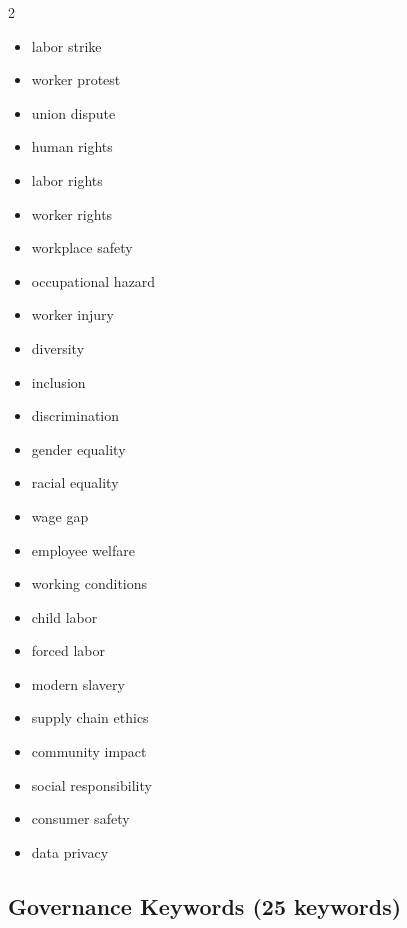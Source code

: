 \documentclass[12pt,a4paper]{article}
\begin{document}
\begin{multicols}{2}
\begin{itemize}[itemsep=0.2em]
    \item labor strike
    \item worker protest
    \item union dispute
    \item human rights
    \item labor rights
    \item worker rights
    \item workplace safety
    \item occupational hazard
    \item worker injury
    \item diversity
    \item inclusion
    \item discrimination
    \item gender equality
    \item racial equality
    \item wage gap
    \item employee welfare
    \item working conditions
    \item child labor
    \item forced labor
    \item modern slavery
    \item supply chain ethics
    \item community impact
    \item social responsibility
    \item consumer safety
    \item data privacy
\end{itemize}
\end{multicols}

\subsection{Governance Keywords (25 keywords)}
\end{document}
